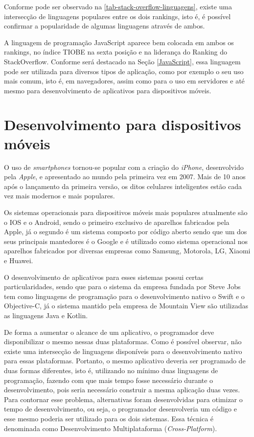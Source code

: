 \newpage
Conforme pode ser observado na \autoref{tab-stack-overflow-linguagens}, existe uma intersecção de linguagens populares entre os dois rankings, isto é, é possível confirmar a popularidade de algumas linguagens através de ambos.

A linguagem de programação JavaScript aparece bem colocada em ambos os rankings, no índice TIOBE\cite{tiobeDefinition} na sexta posição e na liderança do Ranking do StackOverflow\cite{stackOverflowRanking}. Conforme será destacado na Seção \ref{JavaScript}, essa linguagem pode ser utilizada para diversos tipos de aplicação, como por exemplo o seu uso mais comum, isto é, em navegadores, assim como para o uso em servidores e até mesmo para desenvolvimento de aplicativos para dispositivos móveis.

\section{Desenvolvimento para dispositivos móveis}
\label{sec-desenvolvimento-apps}

O uso de \textit{smartphones} tornou-se popular com a criação do \textit{iPhone}, desenvolvido pela \textit{Apple}, e apresentado ao mundo pela primeira vez em 2007. Mais de 10 anos após o lançamento da primeira versão, os ditos celulares inteligentes estão cada vez mais modernos e mais populares.\cite{iphoneApple}


Os sistemas operacionais para dispositivos móveis mais populares atualmente são o IOS e o Android, sendo o primeiro exclusivo de aparelhos fabricados pela Apple, já o segundo é um sistema composto por código aberto sendo que um dos seus principais mantedores é o Google e é utilizado como sistema operacional nos aparelhos fabricados por diversas empresas como Samsung, Motorola, LG, Xiaomi e Huawei.

O desenvolvimento de aplicativos para esses sistemas possui certas particularidades, sendo que para o sistema da empresa fundada por Steve Jobs tem como linguagens de programação para o desenvolvimento nativo o Swift e o Objective-C, já o sistema mantido pela empresa de Mountain View são utilizadas as linguagens Java e Kotlin.

De forma a aumentar o alcance de um aplicativo, o programador deve disponibilizar o mesmo nessas duas plataformas. Como é possível observar, não existe uma intersecção de linguagens disponíveis para o desenvolvimento nativo para essas plataformas. Portanto, o mesmo aplicativo deveria ser programado de duas formas diferentes, isto é, utilizando no mínimo duas linguagens de programação, fazendo com que mais tempo fosse necessário durante o desenvolvimento, pois seria necessário construir a mesma aplicação duas vezes. Para contornar esse problema, alternativas foram desenvolvidas para otimizar o tempo de desenvolvimento, ou seja, o programador desenvolveria um código e esse mesmo poderia ser utilizado para os dois sistemas. Essa técnica é denominada como Desenvolvimento Multiplataforma (\textit{Cross-Platform}).\cite{desenvolvimentoMobile}

